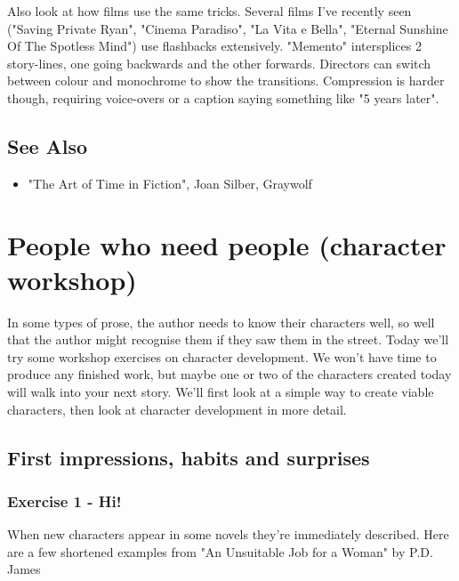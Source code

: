 \documentclass[11pt]{article}
\begin{document}
 
Also look at how films use the same tricks. Several films I've recently seen
("Saving Private Ryan", "Cinema Paradiso", "La Vita e Bella", "Eternal Sunshine
Of The Spotless Mind") use flashbacks extensively. "Memento" intersplices 2
story-lines, one going backwards and the other forwards. Directors can switch between colour and monochrome to show the transitions. Compression is harder though, requiring voice-overs or a caption saying something like "5 years later".



\subsection*{See Also}
\begin{itemize}
\item "The Art of Time in Fiction", Joan Silber, Graywolf
\end{itemize}
\newpage
\section{People who need people (character workshop) }
In some types of prose, the author needs to know their characters well, so well
that the author might recognise them if they saw them in the street. Today
we'll try some workshop exercises on character development. We won't have time
to produce any finished work, but maybe one or two of the characters created
today will walk into your next story. We'll first look at a simple way to
create viable characters, then look at character development in more detail.



\subsection*{First impressions, habits and surprises}
\subsubsection*{Exercise 1 - Hi!}

When new characters appear in some novels they're immediately described. Here are a few shortened examples from "An Unsuitable Job for a Woman" by P.D. James
\end{document}
